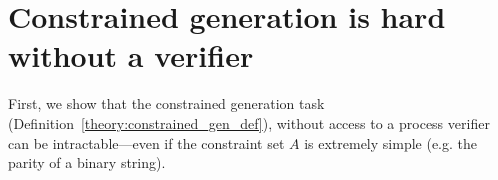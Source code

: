 

\section{Constrained generation is hard without a verifier}
\label{s:hardness}

First, we show that the constrained generation task (Definition~\ref{theory:constrained_gen_def}), without access to a process verifier can be intractable---even if the constraint set $A$ is extremely simple (e.g. the parity of a binary string). 

